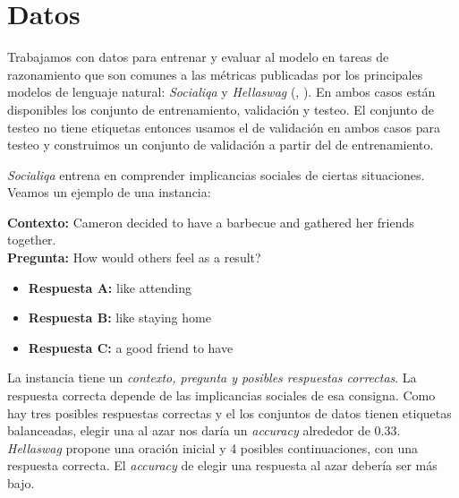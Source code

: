 \documentclass{book}
\begin{document}
\section{Datos}
Trabajamos con datos para entrenar y evaluar al modelo en tareas de razonamiento que son comunes a las métricas publicadas por los principales modelos de lenguaje natural: \textit{Socialiqa} y \textit{Hellaswag} (\cite{sap2019socialiqa}, \cite{zellers2019hellaswag}  ). En ambos casos están disponibles los conjunto de entrenamiento, validación y testeo. El conjunto de testeo no tiene etiquetas entonces usamos el de validación en ambos casos para testeo y construimos un conjunto de validación a partir del de entrenamiento. 

\textit{Socialiqa} entrena en comprender implicancias sociales de ciertas situaciones. Veamos un ejemplo de una instancia:


\begin{mdframed}
\small %
\textbf{Contexto:} Cameron decided to have a barbecue and gathered her friends together.\\
\textbf{Pregunta:} How would others feel as a result?
\begin{itemize}
    \item \textbf{Respuesta A:} like attending
    \item \textbf{Respuesta B:} like staying home
    \item \textbf{Respuesta C:} a good friend to have
\end{itemize}
\end{mdframed}

La instancia tiene un \textit{contexto, pregunta y posibles respuestas correctas}. La respuesta correcta depende de las implicancias sociales de esa consigna. Como hay tres posibles respuestas correctas y el los conjuntos de datos tienen etiquetas balanceadas, elegir una al azar nos daría un \textit{accuracy} alrededor de 0.33. 
\textit{Hellaswag} propone una oración inicial y 4 posibles continuaciones, con una respuesta correcta. El \textit{accuracy} de elegir una respuesta al azar debería ser más bajo.
\end{document}

